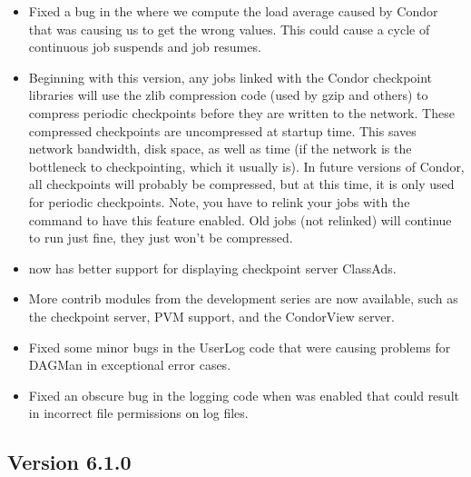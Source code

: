 \begin{itemize}

\item Fixed a bug in the  where we compute the load
average caused by Condor that was causing us to get the wrong values.
This could cause a cycle of continuous job suspends and job resumes.

\item Beginning with this version, any jobs linked with the Condor
checkpoint libraries will use the zlib compression code (used by gzip
and others) to compress periodic checkpoints before they are written
to the network.  
These compressed checkpoints are uncompressed at startup time.  
This saves network bandwidth, disk space, as well as time (if the
network is the bottleneck to checkpointing, which it usually is). 
In future versions of Condor, all checkpoints will probably be
compressed, but at this time, it is only used for periodic
checkpoints.  
Note, you have to relink your jobs with the  command
to have this feature enabled.
Old jobs (not relinked) will continue to run just fine, they just
won't be compressed.

\item {} now has better support for displaying checkpoint
server ClassAds. 

\item More contrib modules from the development series are now
available, such as the checkpoint server, PVM support, and the
CondorView server.  

\item Fixed some minor bugs in the UserLog code that were causing
problems for DAGMan in exceptional error cases.

\item Fixed an obscure bug in the logging code when  was
enabled that could result in incorrect file permissions on log files. 

\end{itemize}

\subsection{\label{sec:New-6-1-0}Version 6.1.0}

